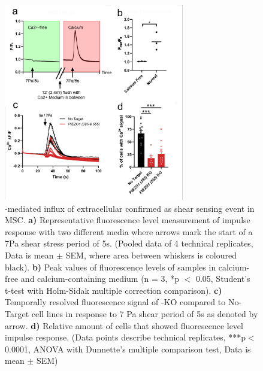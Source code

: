 \begin{figure}
\centering
\includegraphics[width = 0.7\textwidth]{Combined_CalciumFree_KnockOut.png}
\caption{\Piezo{}-mediated influx of extracellular \calciumS confirmed as shear sensing event in MSC. \hfill \newline 
\textbf{a)} Representative fluorescence level measurement of impulse response with two different media where arrows mark the start of a 7Pa shear stress period of 5s. (Pooled data of 4 technical replicates, Data is mean $\pm$ SEM, where area between whiskers is coloured black).	
\textbf{b)} Peak values of fluorescence levels of samples in calcium-free and calcium-containing medium (n = 3, *p $<$ 0.05, Student's t-test with Holm-Sidak multiple correction comparison). 
\textbf{c)} Temporally resolved fluorescence signal of \Piezo{}-KO compared to No-Target cell lines in response to 7 Pa shear period of 5s as denoted by arrow. 
\textbf{d)} Relative amount of cells that showed fluorescence level impulse response. (Data points describe technical replicates, ***p$<$0.0001, ANOVA with Dunnette's multiple comparison test, Data is mean $\pm$ SEM)}
\label{fig:CalcImaging_Cells}
\end{figure}

